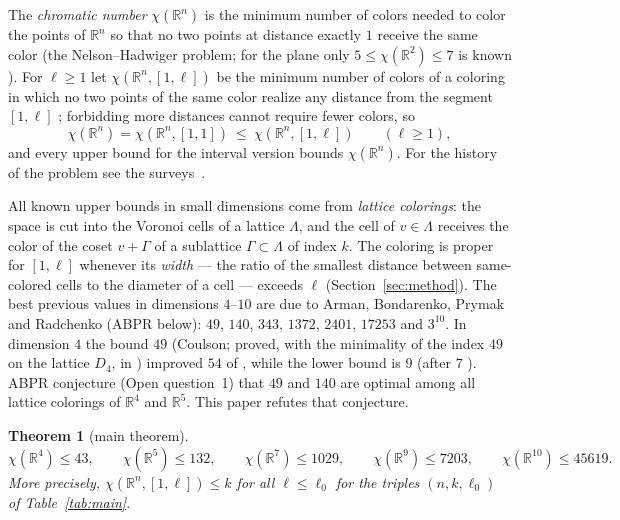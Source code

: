 \documentclass[10pt]{article}
\theoremstyle{plain}
\newtheorem{theorem}{Theorem}[section]
\theoremstyle{remark}
\newcommand{\R}{\mathbb{R}}
\begin{document}
The \emph{chromatic number} $\chi(\R^n)$ is the minimum number of colors
needed to color the points of $\R^n$ so that no two points at distance
exactly $1$ receive the same color (the Nelson--Hadwiger problem; for the
plane only $5\le\chi(\R^2)\le7$ is known \cite{deGrey,Soifer}). For
$\ell\ge1$ let $\chi(\R^n,[1,\ell])$ be the minimum number of colors of a
coloring in which no two points of the same color realize any distance from
the segment $[1,\ell]$ \cite{Ivanov2011}; forbidding more distances cannot
require fewer colors, so
\begin{equation}\label{eq:mono}
\chi(\R^n)=\chi(\R^n,[1,1])\ \le\ \chi(\R^n,[1,\ell])\qquad(\ell\ge1),
\end{equation}
and every upper bound for the interval version bounds $\chi(\R^n)$. For
the history of the problem see the surveys~\cite{BogolubskyRaigorodskii,Raigorodskii2001,Raigorodskii2013,Raigorodskii2014}.

All known upper bounds in small dimensions come from \emph{lattice
colorings}: the space is cut into the Voronoi cells of a lattice $\Lambda$,
and the cell of $v\in\Lambda$ receives the color of the coset $v+\Gamma$ of
a sublattice $\Gamma\subset\Lambda$ of index $k$. The coloring is proper for
$[1,\ell]$ whenever its \emph{width} --- the ratio of the smallest distance
between same-colored cells to the diameter of a cell --- exceeds $\ell$
(Section~\ref{sec:method}). The best previous values in dimensions $4$--$10$
are due to Arman, Bondarenko, Prymak and Radchenko \cite{ABPR} (ABPR below):
$49$, $140$, $343$, $1372$, $2401$, $17253$ and $3^{10}$. In dimension $4$
the bound $49$ (Coulson; proved, with the minimality of the index $49$ on
the lattice $D_4$, in \cite{ABPR}) improved $54$ of \cite{RadoicicToth},
while the lower bound is $9$ \cite{ExooIsmailescu} (after $7$
\cite{Ivanov2006}). ABPR conjecture (Open question~1) that $49$ and $140$ are
optimal among all lattice colorings of $\R^4$ and $\R^5$. This paper refutes
that conjecture.

\begin{theorem}[main theorem]\label{thm:main}
\[
\chi(\R^4)\le43,\qquad \chi(\R^5)\le132,\qquad \chi(\R^7)\le1029,\qquad
\chi(\R^9)\le7203,\qquad \chi(\R^{10})\le45619 .
\]
More precisely, $\chi(\R^n,[1,\ell])\le k$ for all $\ell\le\ell_0$ for the
triples $(n,k,\ell_0)$ of Table~\ref{tab:main}.
\end{theorem}
\end{document}
